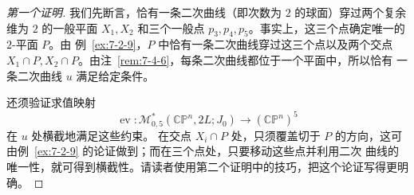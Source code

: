 \begin{proof}[第一个证明]
我们先断言，恰有一条二次曲线（即次数为 $2$ 的球面）穿过两个复余维为 $2$ 的一般平面
$X_1,X_2$ 和三个一般点 $p_3,p_4,p_5$。事实上，这三个点确定唯一的 $2$-平面 $P$。由
例~\ref{ex:7-2-9}，$P$ 中恰有一条二次曲线穿过这三个点以及两个交点
$X_1\cap P,X_2\cap P$。由注~\ref{rem:7-4-6}，每条二次曲线都位于一个平面中，所以恰有
一条二次曲线 $u$ 满足给定条件。

还须验证求值映射
\[
  \operatorname{ev}:
  \mathcal M^*_{0,5}(\mathbb{CP}^n,2L;J_0)
  \longrightarrow(\mathbb{CP}^n)^5
\]
在 $u$ 处横截地满足这些约束。
在交点 $X_i\cap P$ 处，只须覆盖切于 $P$
的方向，这可由例~\ref{ex:7-2-9} 的论证做到；而在三个点处，只要移动这些点并利用二次
曲线的唯一性，就可得到横截性。请读者使用第二个证明中的技巧，把这个论证写得更明确。
\end{proof}

